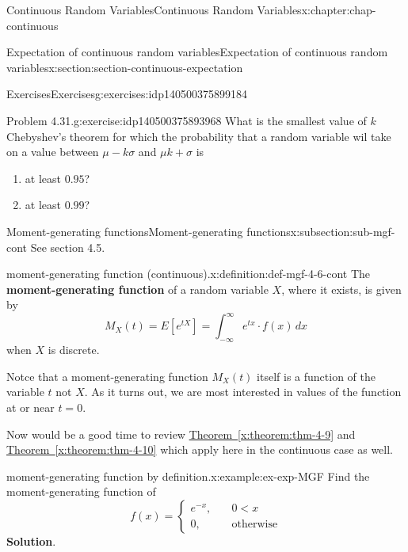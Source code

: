 \documentclass[oneside,10pt,]{book}
\newcommand{\blocktitlefont}{\relax}
\newcommand{\xreffont}{\relax}
\newcommand{\terminology}[1]{\textbf{#1}}
\newcommand{\lt}{<}
\newcommand{\amp}{&}
\begin{document}
\begin{chapterptx}{Continuous Random Variables}{}{Continuous Random Variables}{}{}{x:chapter:chap-continuous}
\begin{sectionptx}{Expectation of continuous random variables}{}{Expectation of continuous random variables}{}{}{x:section:section-continuous-expectation}
\begin{exercises-subsection}{Exercises}{}{Exercises}{}{}{g:exercises:idp140500375899184}
\begin{divisionexercise}{1}{Problem 4.31.}{}{g:exercise:idp140500375893968}%
What is the smallest value of \(k\) Chebyshev's theorem for which the probability that a random variable wil take on a value between \(\mu -k\sigma\) and \(\mu k+\sigma\) is%
\begin{enumerate}[label=(\alph*)]
\item{}at least \(0.95\)?%
\item{}at least \(0.99\)?%
\end{enumerate}
%
\end{divisionexercise}%
\end{exercises-subsection}
%
%
\typeout{************************************************}
\typeout{************************************************}
%
\begin{subsectionptx}{Moment-generating functions}{}{Moment-generating functions}{}{}{x:subsection:sub-mgf-cont}
See section 4.5.%
\begin{definition}{moment-generating function (continuous).}{x:definition:def-mgf-4-6-cont}%
The \terminology{moment-generating function} of a random variable \(X\), where it exists, is given by%
\begin{equation*}
\displaystyle
M_X(t) = E[e^{tX}] = \int_{-\infty}^\infty e^{tx}\cdot f(x)\,dx
\end{equation*}
when \(X\) is discrete.%
\end{definition}
Notce that a moment-generating function \(\displaystyle M_X(t)\) itself is a function of the variable \(\displaystyle t\) not \(X\). As it turns out, we are most interested in values of the function at or near \(t=0\).%
\par
Now would be a good time to review \hyperref[x:theorem:thm-4-9]{Theorem~{\xreffont\ref{x:theorem:thm-4-9}}} and \hyperref[x:theorem:thm-4-10]{Theorem~{\xreffont\ref{x:theorem:thm-4-10}}} which apply here in the continuous case as well.%
\begin{example}{moment-generating function by definition.}{x:example:ex-exp-MGF}%
Find the moment-generating function of%
\begin{equation*}
f(x) = \begin{cases}e^{-x},
\amp \quad 0 \lt x
\\ 0, \amp \quad
\text{otherwise}\end{cases}
\end{equation*}
%
\textbf{\blocktitlefont Solution}.\quad{}%
\begin{equation*}

\end{equation*}
\end{example}
\end{subsectionptx}
\end{sectionptx}
\end{chapterptx}
\end{document}
